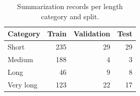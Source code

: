 \begin{table}[t]
\centering
\caption{Summarization records per length category and split.}
\label{tab:t2_summarization_categories}
\begin{tabular}{lrrr}
\toprule
Category & Train & Validation & Test \\
\midrule
Short & 235 & 29 & 29 \\
Medium & 188 & 4 & 3 \\
Long & 46 & 9 & 8 \\
Very long & 123 & 22 & 17 \\
\bottomrule
\end{tabular}
\end{table}
